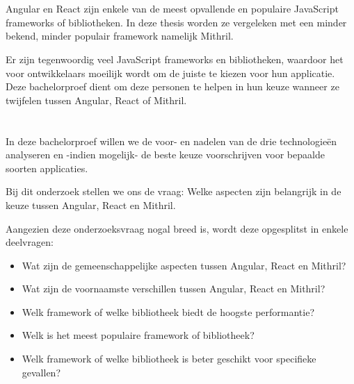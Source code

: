 \section{}
\label{sec:probleemstelling}

Angular en React zijn enkele van de meest opvallende en populaire JavaScript frameworks of bibliotheken. In deze thesis worden ze vergeleken met een minder bekend, minder populair framework namelijk Mithril. 

Er zijn tegenwoordig veel JavaScript frameworks en bibliotheken, waardoor het voor ontwikkelaars moeilijk wordt om de juiste te kiezen voor hun applicatie. Deze bachelorproef dient om deze personen te helpen in hun keuze wanneer ze twijfelen tussen Angular, React of Mithril.

\section{}
\label{sec:onderzoeksvraag}

In deze bachelorproef willen we de voor- en nadelen van de drie technologieën analyseren en -indien mogelijk- de beste keuze voorschrijven voor bepaalde soorten applicaties.

Bij dit onderzoek stellen we ons de vraag: Welke aspecten zijn belangrijk in de keuze tussen Angular, React en Mithril.

Aangezien deze onderzoeksvraag nogal breed is, wordt deze opgesplitst in enkele deelvragen:
\begin{itemize}
    \item Wat zijn de gemeenschappelijke aspecten tussen Angular, React en Mithril?
    \item Wat zijn de voornaamste verschillen tussen Angular, React en Mithril?
    \item Welk framework of welke bibliotheek biedt de hoogste performantie?
    \item Welk is het meest populaire framework of bibliotheek?
    \item Welk framework of welke bibliotheek is beter geschikt voor specifieke gevallen?
\end{itemize}

\section{}
\label{sec:onderzoeksdoelstelling}

